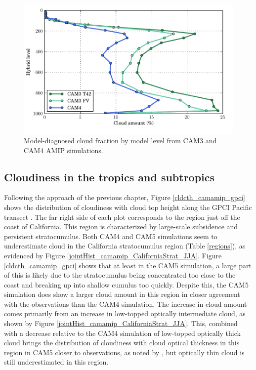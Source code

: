 \begin{figure}
    \centering
    \includegraphics{../graphics/cl_camamip.pdf}
    \caption{Model-diagnosed cloud fraction by model level from CAM3 and CAM4 AMIP simulations.}
    \label{cl_camamip}
\end{figure}

\subsection{Cloudiness in the tropics and subtropics}
Following the approach of the previous chapter, Figure \ref{cldcth_camamip_gpci} shows the distribution of cloudiness with cloud top height along the GPCI Pacific transect \citep{teixeira_et_al_2011}. The far right side of each plot corresponds to the region just off the coast of California. This region is characterized by large-scale subsidence and persistent stratocumulus. Both CAM4 and CAM5 simulations seem to underestimate cloud in the California stratocumulus region (Table \ref{regions}), as evidenced by Figure \ref{jointHist_camamip_CaliforniaStrat_JJA}. Figure \ref{cldcth_camamip_gpci} shows that at least in the CAM5 simulation, a large part of this is likely due to the stratocumulus being concentrated too close to the coast and breaking up into shallow cumulus too quickly. Despite this, the CAM5 simulation does show a larger cloud amount in this region in closer agreement with the observations than the CAM4 simulation. The increase in cloud amount comes primarily from an increase in low-topped optically intermediate cloud, as shown by Figure \ref{jointHist_camamip_CaliforniaStrat_JJA}. This, combined with a decrease relative to the CAM4 simulation of low-topped optically thick cloud brings the distribution of cloudiness with cloud optical thickness in this region in CAM5 closer to observations, as noted by \cite{kay_et_al_2011}, but optically thin cloud is still underestimated in this region.

